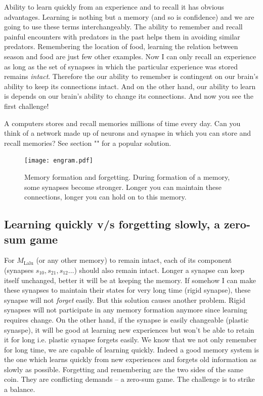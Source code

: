 \documentclass[]{resonance}
\begin{document}
Ability to learn quickly from an experience and to recall it has obvious
advantages. Learning is nothing but a memory (and so is confidence) and we are
going to use these terms interchangeably. The ability to remember and recall
painful encounters with predators in the past helps them in avoiding similar
predators. Remembering the location of food, learning the relation between
season and food are just few other examples. Now I can only recall an experience
as long as the set of synapses in which the particular experience was stored
remains \emph{intact}. Therefore the our ability to remember is contingent on our
brain's ability to keep its connections intact.  And on the other hand, our
ability to learn is depends on our brain's ability to change its connections.
And now you see the first challenge!

A computers stores and recall memories millions of time every day.  Can you
think of a network made up of neurons and synapse in which you can store and
recall memories? See section "" for a popular solution.

\begin{figure}[!t] \caption{Memory formation and forgetting. During formation of
    a memory, some synapses become stronger. Longer you can maintain these
connections, longer you can hold on to this memory.  }\label{fig:engram}
\texttt{[image: engram.pdf]} \end{figure}

\subsection{Learning quickly v/s forgetting slowly, a zero-sum game}\label{subsec:zero_sum} 

For $M_\text{Lalu}$ (or any other memory) to remain intact, each of its
component (synapses $s_{10}, s_{21}, s_{12} \ldots$) should also remain intact.
Longer a synapse can keep itself unchanged, better it will be at keeping the
memory. If somehow I can make these synapses to maintain their states for very
long time (rigid synapse), these synapse will not \emph{forget} easily. But this
solution causes another problem. Rigid synapses will not participate in any memory 
formation anymore since learning requires change. On
the other hand, if the synapse is easily changeable (plastic synaspe), it will
be good at learning new experiences but won't be able to retain it for long i.e.
plastic synapse forgets easily. We know that we not only remember for long time,
we are capable of learning quickly.  Indeed a good memory system is the one which
learns quickly from new experiences and forgets old information as slowly as
possible.  Forgetting and remembering are the two sides of the same coin.  They
are conflicting demands -- a zero-sum game.  The challenge is to strike a
balance. 
\end{document}
